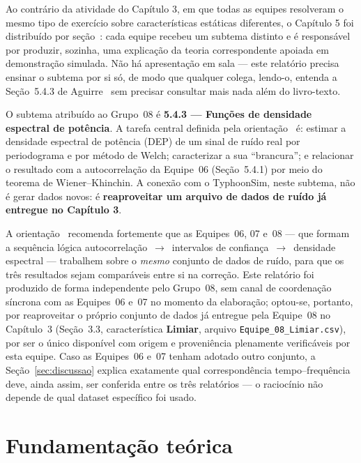 Ao contrário da atividade do Capítulo 3, em que todas as equipes resolveram o mesmo tipo de
exercício sobre características estáticas diferentes, o Capítulo 5 foi distribuído por
seção~\cite{orientacaocap5}: cada equipe recebeu um subtema distinto e é responsável por
produzir, sozinha, uma explicação da teoria correspondente apoiada em demonstração simulada. Não
há apresentação em sala --- este relatório precisa ensinar o subtema por si só, de modo que
qualquer colega, lendo-o, entenda a Seção~5.4.3 de Aguirre~\cite{aguirre2015} sem precisar
consultar mais nada além do livro-texto.

O subtema atribuído ao Grupo~08 é \textbf{5.4.3 --- Funções de densidade espectral de
potência}. A tarefa central definida pela orientação~\cite{orientacaocap5} é: estimar a
densidade espectral de potência (DEP) de um sinal de ruído real por periodograma e por método de
Welch; caracterizar a sua ``brancura''; e relacionar o resultado com a autocorrelação da
Equipe~06 (Seção~5.4.1) por meio do teorema de Wiener--Khinchin. A conexão com o TyphoonSim,
neste subtema, não é gerar dados novos: é \textbf{reaproveitar um arquivo de dados de ruído já
entregue no Capítulo 3}.

\begin{caixa}[title={Sequência 06--07--08 e dataset utilizado}]
A orientação~\cite{orientacaocap5} recomenda fortemente que as Equipes~06, 07 e~08 --- que
formam a sequência lógica autocorrelação~$\to$~intervalos de confiança~$\to$~densidade espectral
--- trabalhem sobre o \emph{mesmo} conjunto de dados de ruído, para que os três resultados sejam
comparáveis entre si na correção. Este relatório foi produzido de forma independente pelo
Grupo~08, sem canal de coordenação síncrona com as Equipes~06 e~07 no momento da elaboração;
optou-se, portanto, por reaproveitar o próprio conjunto de dados já entregue pela Equipe~08 no
Capítulo~3 (Seção~3.3, característica \textbf{Limiar}, arquivo \texttt{Equipe\_08\_Limiar.csv}),
por ser o único disponível com origem e proveniência plenamente verificáveis por esta equipe.
Caso as Equipes~06 e~07 tenham adotado outro conjunto, a Seção~\ref{sec:discussao} explica
exatamente qual correspondência tempo--frequência deve, ainda assim, ser conferida entre os três
relatórios --- o raciocínio não depende de qual dataset específico foi usado.
\end{caixa}

\section{Fundamentação teórica}
\label{sec:teoria}

